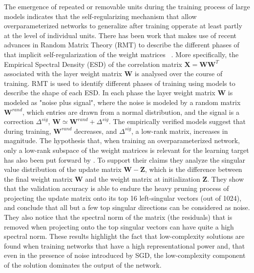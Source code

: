 The emergence of repeated or removable units during the training process of large models indicates that the self-regularizing mechanism that allow overparameterized networks to generalize after training opperate at least partly at the level of individual units. There has been work that makes use of recent advances in Random Matrix Theory (RMT) to describe the different phases of that implicit self-regularization of the weight matrices ~\autocite{martin2018implicit}. More specifically, the Empirical Spectral Density (ESD) of the correlation matrix $\mathbf{X} = \mathbf{W}\mathbf{W}^T$ associated with the layer weight matrix $\mathbf{W}$ is analysed over the course of training. RMT is used to identify different phases of training using models to describe the shape of each ESD. In each phase the layer weight matrix $\mathbf{W}$ is modeled as "noise plus signal", where the noise is modeled by a random matrix $\mathbf{W}^{rand}$, which entries are drawn from a normal distribution, and the signal is a correction $\Delta^{sig}$, $\mathbf{W} \simeq \mathbf{W}^{rand} + \Delta^{sig}$. The empirically verified models suggest that during training, $\mathbf{W}^{rand}$ decreases, and $\Delta^{sig}$, a low-rank matrix, increases in magnitude. The hypothesis that, when training an overparameterized network, only a low-rank subspace of the weight matrices is relevant for the learning target has also been put forward by \cite{nagarajan2019uniform}. To support their claims they analyze the singular value distribution of the update matrix $\mathbf{W} - \mathbf{Z}$, which is the difference between the final weight matrix $\mathbf{W}$ and the weight matrix at initialization $\mathbf{Z}$. They show that the validation accuracy is able to endure the heavy pruning process of projecting the update matrix onto its top 16 left-singular vectors (out of 1024), and conclude that all but a few top singular directions can be considered as noise. They also notice that the spectral norm of the matrix (the residuals) that is removed when projecting onto the top singular vectors can have quite a high spectral norm. These results highlight the fact that low-complexity solutions are found when training networks that have a high representational power and, that even in the presence of noise introduced by SGD, the low-complexity component of the solution dominates the output of the network. \\


